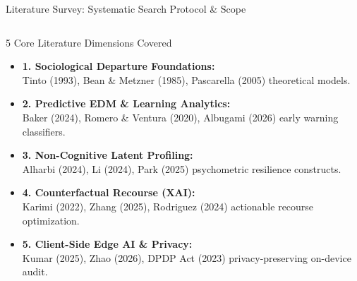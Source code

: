 \documentclass{beamer}
\begin{document}
\begin{frame}[t]{Literature Survey: Systematic Search Protocol \& Scope}
\begin{columns}[T]
    \begin{block}{\scriptsize 5 Core Literature Dimensions Covered}
      \fontsize{5.2pt}{6.6pt}\selectfont
      \begin{itemize}\setlength{\itemsep}{2pt}
        \item \textbf{1. Sociological Departure Foundations:}\\ Tinto (1993), Bean \& Metzner (1985), Pascarella (2005) theoretical models.
        \item \textbf{2. Predictive EDM \& Learning Analytics:}\\ Baker (2024), Romero \& Ventura (2020), Albugami (2026) early warning classifiers.
        \item \textbf{3. Non-Cognitive Latent Profiling:}\\ Alharbi (2024), Li (2024), Park (2025) psychometric resilience constructs.
        \item \textbf{4. Counterfactual Recourse (XAI):}\\ Karimi (2022), Zhang (2025), Rodriguez (2024) actionable recourse optimization.
        \item \textbf{5. Client-Side Edge AI \& Privacy:}\\ Kumar (2025), Zhao (2026), DPDP Act (2023) privacy-preserving on-device audit.
      \end{itemize}
    \end{block}
  \end{columns}
\end{frame}
\end{document}
